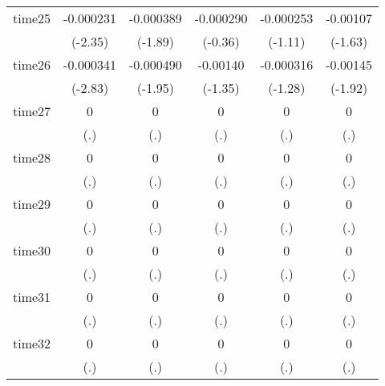 \begin{table}[htbp]
\begin{tabular}{l*{5}{c}}
time25      &   -0.000231\sym{*}  &   -0.000389         &   -0.000290         &   -0.000253         &    -0.00107         \\
            &     (-2.35)         &     (-1.89)         &     (-0.36)         &     (-1.11)         &     (-1.63)         \\
time26      &   -0.000341\sym{**} &   -0.000490         &    -0.00140         &   -0.000316         &    -0.00145         \\
            &     (-2.83)         &     (-1.95)         &     (-1.35)         &     (-1.28)         &     (-1.92)         \\
time27      &           0         &           0         &           0         &           0         &           0         \\
            &         (.)         &         (.)         &         (.)         &         (.)         &         (.)         \\
time28      &           0         &           0         &           0         &           0         &           0         \\
            &         (.)         &         (.)         &         (.)         &         (.)         &         (.)         \\
time29      &           0         &           0         &           0         &           0         &           0         \\
            &         (.)         &         (.)         &         (.)         &         (.)         &         (.)         \\
time30      &           0         &           0         &           0         &           0         &           0         \\
            &         (.)         &         (.)         &         (.)         &         (.)         &         (.)         \\
time31      &           0         &           0         &           0         &           0         &           0         \\
            &         (.)         &         (.)         &         (.)         &         (.)         &         (.)         \\
time32      &           0         &           0         &           0         &           0         &           0         \\
            &         (.)         &         (.)         &         (.)         &         (.)         &         (.)         \\

\end{tabular}
\end{table}
